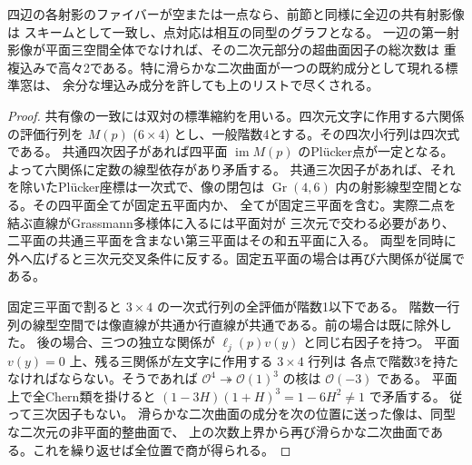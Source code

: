 \begin{proposition}\label{prop:surface-degree-bound}
四辺の各射影のファイバーが空または一点なら、前節と同様に全辺の共有射影像は
スキームとして一致し、点対応は相互の同型のグラフとなる。
一辺の第一射影像が平面三空間全体でなければ、その二次元部分の超曲面因子の総次数は
重複込みで高々2である。特に滑らかな二次曲面が一つの既約成分として現れる標準窓は、
余分な埋込み成分を許しても上のリストで尽くされる。
\end{proposition}
\begin{proof}
共有像の一致には双対の標準縮約を用いる。四次元文字に作用する六関係の評価行列を
$M(p)$ ($6\times4$) とし、一般階数4とする。その四次小行列は四次式である。
共通四次因子があれば四平面 $\operatorname{im}M(p)$ のPlücker点が一定となる。
よって六関係に定数の線型依存があり矛盾する。
共通三次因子があれば、それを除いたPlücker座標は一次式で、像の閉包は
$\operatorname{Gr}(4,6)$ 内の射影線型空間となる。その四平面全てが固定五平面内か、
全てが固定三平面を含む。実際二点を結ぶ直線がGrassmann多様体に入るには平面対が
三次元で交わる必要があり、二平面の共通三平面を含まない第三平面はその和五平面に入る。
両型を同時に外へ広げると三次元交叉条件に反する。固定五平面の場合は再び六関係が従属である。

固定三平面で割ると $3\times4$ の一次式行列の全評価が階数1以下である。
階数一行列の線型空間では像直線が共通か行直線が共通である。前の場合は既に除外した。
後の場合、三つの独立な関係が $\ell_j(p)v(y)$ と同じ右因子を持つ。
平面 $v(y)=0$ 上、残る三関係が左文字に作用する $3\times4$ 行列は
各点で階数3を持たなければならない。そうであれば
$\mathcal O^4\twoheadrightarrow\mathcal O(1)^3$ の核は $\mathcal O(-3)$ である。
平面上で全Chern類を掛けると $(1-3H)(1+H)^3=1-6H^2\ne1$ で矛盾する。
従って三次因子もない。
滑らかな二次曲面の成分を次の位置に送った像は、同型な二次元の非平面的整曲面で、
上の次数上界から再び滑らかな二次曲面である。これを繰り返せば全位置で商が得られる。
\end{proof}
